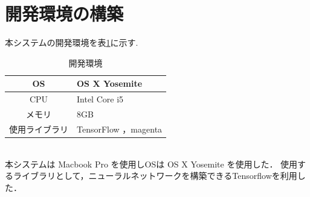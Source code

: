 \section{開発環境の構築}
本システムの開発環境を表\ref{tab:開発環境}に示す.
\begin{table}[h]
    \begin{center}
    \caption{開発環境}
    \label{tab:開発環境}
    \begin{tabular}{|c|p{}|}
    \hline
    OS & OS X Yosemite\\
    \hline
    CPU & Intel Core i5\\
    \hline
    メモリ & 8GB\\
    \hline
    使用ライブラリ & TensorFlow ，magenta\\
    \hline
    \end{tabular}
    \end{center}
\end{table}\\
本システムは Macbook Pro を使用しOSは OS X Yosemite を使用した．
使用するライブラリとして，ニューラルネットワークを構築できるTensorflowを利用した．
